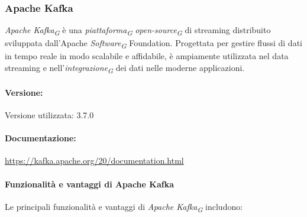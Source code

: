 \subsubsection{Apache Kafka}
\textit{Apache Kafka}\textsubscript{\textit{G}} è una \textit{piattaforma}\textsubscript{\textit{G}} \textit{open-source}\textsubscript{\textit{G}} di streaming distribuito sviluppata dall'Apache \textit{Software}\textsubscript{\textit{G}} Foundation. Progettata per gestire flussi di dati in tempo reale in modo scalabile e affidabile, è ampiamente utilizzata nel data streaming e nell'\textit{integrazione}\textsubscript{\textit{G}} dei dati nelle moderne applicazioni.

\paragraph{Versione:}
Versione utilizzata: 3.7.0

\paragraph{Documentazione:}
\url{https://kafka.apache.org/20/documentation.html}

\paragraph{Funzionalità e vantaggi di Apache Kafka}
Le principali funzionalità e vantaggi di \textit{Apache Kafka}\textsubscript{\textit{G}} includono:

